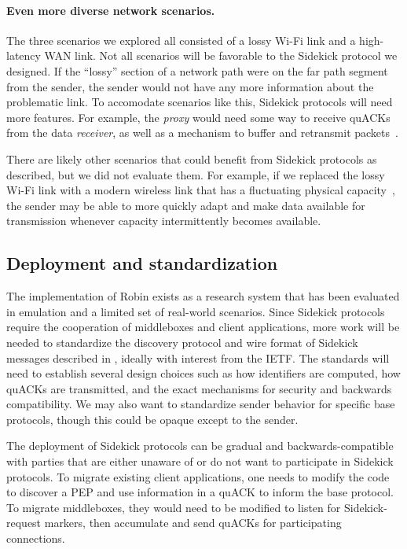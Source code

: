 \paragraph{Even more diverse network scenarios.}
The three scenarios we explored all consisted of a lossy Wi-Fi link and a
high-latency WAN link. Not all scenarios will be favorable to the
Sidekick protocol we designed.
If the ``lossy'' section of a network path were on the far path segment from the
sender, the sender would not have any more information about the problematic
link. To accomodate scenarios like this, Sidekick protocols will need
more features. For example, the \emph{proxy} would need some way to receive
quACKs from the data \emph{receiver}, as well as a mechanism to buffer and
retransmit packets~\cite{balakrishnan1995snoop,caini2006pepsal}.

There are likely other scenarios that could benefit from Sidekick protocols as
described, but we did not evaluate them. For example, if we replaced the lossy Wi-Fi
link with a modern wireless link that has a fluctuating physical
capacity~\cite{niu2015survey,burchardt2014vlc,koenig2013wireless},
the sender may be able to more quickly adapt and make
data available for transmission whenever capacity intermittently becomes available.

\subsection{Deployment and standardization}
\label{sec:conclusion:future:deployment}

The implementation of Robin exists as a research system that has been evaluated
in emulation and a limited set of real-world scenarios. Since Sidekick protocols
require the cooperation of middleboxes and client applications, more work will
be needed to standardize the discovery protocol and wire format of Sidekick messages
described in , ideally with interest from the IETF.
The standards will need to establish several design choices such as how
identifiers are computed, how quACKs are transmitted, and the exact mechanisms
for security and backwards compatibility.
We may also want to standardize sender behavior for specific base protocols,
though this could be opaque except to the sender.

The deployment of Sidekick protocols can be gradual and backwards-compatible
with parties that are either unaware of or do not want to participate in Sidekick
protocols.
To migrate existing client applications, one needs to modify the code to
discover a PEP and use information in a quACK to inform the base protocol.
To migrate middleboxes, they would need to be modified to listen for
Sidekick-request markers, then accumulate and send quACKs for participating
connections.

